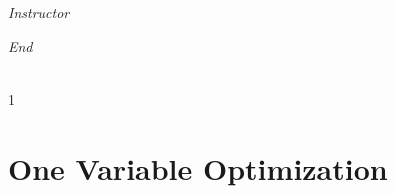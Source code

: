 \documentclass[12pt, oneside]{book}
\begin{document}
\begin{titlepage}
\begin{center}
\begin{large}
            \vspace*{1\baselineskip}

            \textit{Instructor} \\[1ex] %
            \professor

            \vspace*{1\baselineskip}

            \textit{End}\\[1ex]
            {\scshape  \customenddate} \\[0.3\baselineskip] %

            \thispagestyle{empty}

        \end{large}
    \end{center}
\end{titlepage}
\pagebreak






\begin{spacing}{1} %
    \renewcommand{\contentsname}{\Large\textbf{Table of Contents}} %
    \markboth{}{} %
    \pagestyle{fancy} %
    \tableofcontents
\end{spacing}

\fancyhead[R]{\leftmark}


\chapter{One Variable Optimization}\label{real vars}
\vspace*{-0.25in}

\setcounter{chapter}{1}
\end{document}
